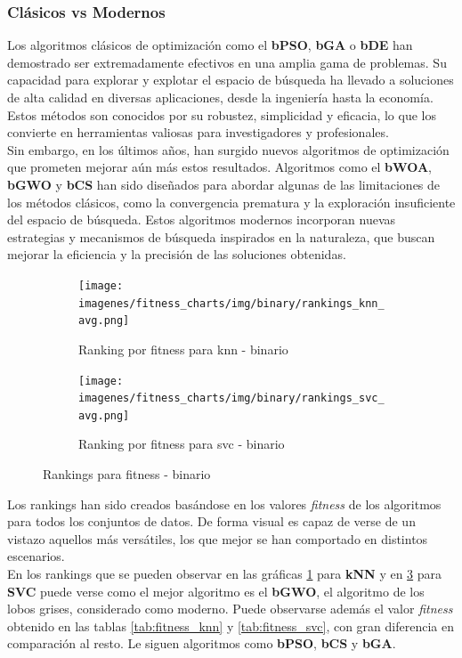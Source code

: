 \subsubsection{Clásicos vs Modernos}
Los algoritmos clásicos de optimización como el \textbf{bPSO}, \textbf{bGA} o \textbf{bDE} han demostrado ser extremadamente efectivos en una amplia gama de problemas. Su capacidad para explorar y explotar el espacio de búsqueda ha llevado a soluciones de alta calidad en diversas aplicaciones, desde la ingeniería hasta la economía. Estos métodos son conocidos por su robustez, simplicidad y eficacia, lo que los convierte en herramientas valiosas para investigadores y profesionales.\\[6pt]
Sin embargo, en los últimos años, han surgido nuevos algoritmos de optimización que prometen mejorar aún más estos resultados. Algoritmos como el \textbf{bWOA}, \textbf{bGWO} y \textbf{bCS} han sido diseñados para abordar algunas de las limitaciones de los métodos clásicos, como la convergencia prematura y la exploración insuficiente del espacio de búsqueda. Estos algoritmos modernos incorporan nuevas estrategias y mecanismos de búsqueda inspirados en la naturaleza, que buscan mejorar la eficiencia y la precisión de las soluciones obtenidas.\\[6pt]

\begin{figure}[htp]
    \centering
    \begin{subfigure}[b]{1\textwidth}
        \texttt{[image: imagenes/fitness\_charts/img/binary/rankings\_knn\_avg.png]}
        \caption{Ranking por fitness para knn - binario}
        \label{fig:ranking_knn}
    \end{subfigure}
    \begin{subfigure}[b]{1\textwidth}
        \texttt{[image: imagenes/fitness\_charts/img/binary/rankings\_svc\_avg.png]}
        \caption{Ranking por fitness para svc - binario}
        \label{fig:ranking_svc}
    \end{subfigure}
    \caption{Rankings para fitness - binario}
\end{figure}

Los rankings han sido creados basándose en los valores \textit{fitness} de los algoritmos para todos los conjuntos de datos. De forma visual es capaz de verse de un vistazo aquellos más versátiles, los que mejor se han comportado en distintos escenarios.\\[6pt]

En los rankings que se pueden observar en las gráficas \ref{fig:ranking_knn} para \textbf{kNN} y en \ref{fig:ranking_svc} para \textbf{SVC} puede verse como el mejor algoritmo es el \textbf{bGWO}, el algoritmo de los lobos grises, considerado como moderno. Puede observarse además el valor \textit{fitness} obtenido en las tablas \ref{tab:fitness_knn} y \ref{tab:fitness_svc}, con gran diferencia en comparación al resto. Le siguen algoritmos como \textbf{bPSO}, \textbf{bCS} y \textbf{bGA}.\\[6pt]

